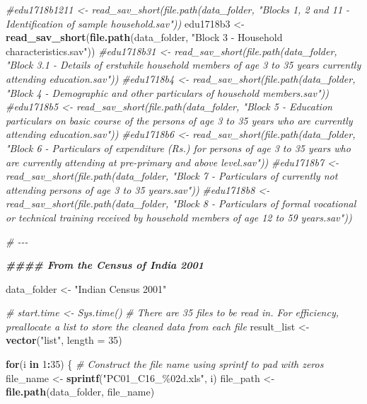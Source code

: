 \documentclass[
]{article}
\newenvironment{Shaded}{\begin{snugshade}}{\end{snugshade}}
\newcommand{\AttributeTok}[1]{\textcolor[rgb]{0.13,0.29,0.53}{#1}}
\newcommand{\CommentTok}[1]{\textcolor[rgb]{0.56,0.35,0.01}{\textit{#1}}}
\newcommand{\ControlFlowTok}[1]{\textcolor[rgb]{0.13,0.29,0.53}{\textbf{#1}}}
\newcommand{\DecValTok}[1]{\textcolor[rgb]{0.00,0.00,0.81}{#1}}
\newcommand{\DocumentationTok}[1]{\textcolor[rgb]{0.56,0.35,0.01}{\textbf{\textit{#1}}}}
\newcommand{\FunctionTok}[1]{\textcolor[rgb]{0.13,0.29,0.53}{\textbf{#1}}}
\newcommand{\NormalTok}[1]{#1}
\newcommand{\OtherTok}[1]{\textcolor[rgb]{0.56,0.35,0.01}{#1}}
\newcommand{\SpecialCharTok}[1]{\textcolor[rgb]{0.81,0.36,0.00}{\textbf{#1}}}
\newcommand{\StringTok}[1]{\textcolor[rgb]{0.31,0.60,0.02}{#1}}
\begin{document}
\begin{Shaded}
\begin{Highlighting}[]
\CommentTok{\#edu1718b1211 \textless{}{-} read\_sav\_short(file.path(data\_folder, "Blocks 1, 2 and 11 {-} Identification of sample household.sav"))}
\NormalTok{edu1718b3  }\OtherTok{\textless{}{-}} \FunctionTok{read\_sav\_short}\NormalTok{(}\FunctionTok{file.path}\NormalTok{(data\_folder, }\StringTok{"Block 3 {-} Household characteristics.sav"}\NormalTok{))}
\CommentTok{\#edu1718b31  \textless{}{-} read\_sav\_short(file.path(data\_folder, "Block 3.1 {-} Details of erstwhile household members of age 3 to 35 years currently attending education.sav"))}
\CommentTok{\#edu1718b4  \textless{}{-} read\_sav\_short(file.path(data\_folder, "Block 4 {-} Demographic and other particulars of household members.sav"))}
\CommentTok{\#edu1718b5  \textless{}{-} read\_sav\_short(file.path(data\_folder, "Block 5 {-} Education particulars on basic course of the persons of age 3 to 35 years who are currently attending education.sav"))}
\CommentTok{\#edu1718b6  \textless{}{-} read\_sav\_short(file.path(data\_folder, "Block 6 {-} Particulars of expenditure (Rs.) for persons of age 3 to 35 years who are currently attending at pre{-}primary and above level.sav"))}
\CommentTok{\#edu1718b7  \textless{}{-} read\_sav\_short(file.path(data\_folder, "Block 7 {-} Particulars of currently not attending persons of age 3 to 35 years.sav"))}
\CommentTok{\#edu1718b8  \textless{}{-} read\_sav\_short(file.path(data\_folder, "Block 8 {-} Particulars of formal vocational or technical training received by household members of age 12 to 59 years.sav"))}


\CommentTok{\# {-}{-}{-}}


\DocumentationTok{\#\#\#\# From the Census of India 2001}

\NormalTok{data\_folder }\OtherTok{\textless{}{-}} \StringTok{"Indian Census 2001"}

\CommentTok{\# start.time \textless{}{-} Sys.time()}
\CommentTok{\# There are 35 files to be read in. For efficiency, preallocate a list to store the cleaned data from each file}
\NormalTok{result\_list }\OtherTok{\textless{}{-}} \FunctionTok{vector}\NormalTok{(}\StringTok{"list"}\NormalTok{, }\AttributeTok{length =} \DecValTok{35}\NormalTok{)}

\ControlFlowTok{for}\NormalTok{(i }\ControlFlowTok{in} \DecValTok{1}\SpecialCharTok{:}\DecValTok{35}\NormalTok{) \{}
  \CommentTok{\# Construct the file name using sprintf to pad with zeros}
\NormalTok{  file\_name }\OtherTok{\textless{}{-}} \FunctionTok{sprintf}\NormalTok{(}\StringTok{"PC01\_C16\_\%02d.xls"}\NormalTok{, i)}
\NormalTok{  file\_path }\OtherTok{\textless{}{-}} \FunctionTok{file.path}\NormalTok{(data\_folder, file\_name)}
  

\end{Highlighting}
\end{Shaded}
\end{document}
